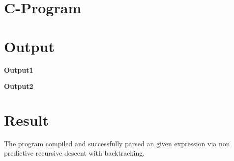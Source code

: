 \break
\section{C-Program}


\section{Output}
\textbf{Output1}

\textbf{Output2}


\section{Result}
The program compiled and successfully parsed an given expression via non predictive recursive descent with backtracking.